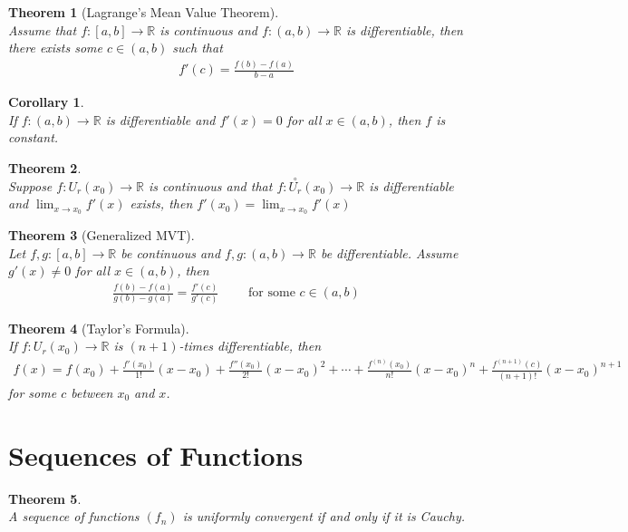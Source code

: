 \documentclass[10pt,a4paper]{article}
\newtheorem{theorem}{Theorem}
\newtheorem{corollary}{Corollary}
\theoremstyle{definition}
\theoremstyle{definition}
\numberwithin{equation}{section}
\numberwithin{theorem}{section}
\numberwithin{proposition}{section}
\numberwithin{lemma}{section}
\numberwithin{corollary}{section}
\begin{document}
\begin{theorem}[Lagrange's Mean Value Theorem]$ $
\\Assume that $f: [a, b] \to \mathbb{R}$ is continuous and $f: (a, b) \to \mathbb{R}$ is differentiable, then there exists some $c \in (a, b)$ such that 
\begin{align*}
f'(c) = \frac{f(b) - f(a)}{b - a}
\end{align*}
\end{theorem}

\begin{corollary}$ $
\\If $f:(a, b) \to \mathbb{R}$ is differentiable and $f'(x) = 0$ for all $x \in (a, b)$, then $f$ is constant. 
\end{corollary}

\begin{theorem}$ $
\\Suppose $f: U_r(x_0) \to \mathbb{R}$ is continuous and that $f: \overset{\circ}{U_r}(x_0) \to \mathbb{R}$ is differentiable and $\lim_{x \to x_0} f'(x)$ exists, then $f'(x_0) = \lim_{x \to x_0} f'(x)$
\end{theorem}

\begin{theorem}[Generalized MVT]$ $
\\Let $f, g: [a, b] \to \mathbb{R}$ be continuous and $f, g: (a, b) \to \mathbb{R}$ be differentiable. Assume $g'(x) \neq 0$ for all $x \in (a, b)$, then 
\begin{align*}
\frac{f(b) - f(a)}{g(b) - g(a)} = \frac{f'(c)}{g'(c)} \qquad \text{ for some } c \in (a, b)
\end{align*}
\end{theorem}

\begin{theorem}[Taylor's Formula]$ $
\\If $f: U_r(x_0) \to \mathbb{R}$ is $(n + 1)$-times differentiable, then 
\begin{align*}
f(x) = f(x_0) + \frac{f'(x_0)}{1!} (x - x_0) + \frac{f''(x_0)}{2!}(x - x_0)^2 + \cdots + \frac{f^{(n)}(x_0)}{n!}(x - x_0)^n + \frac{f^{(n+1)}(c)}{(n+1)!}(x - x_0)^{n+1}
\end{align*}
for some $c$ between $x_0$ and $x$. 
\end{theorem}


\newpage
\section{Sequences of Functions}
\begin{theorem}$ $
\\A sequence of functions $(f_n)$ is uniformly convergent if and only if it is Cauchy. 
\end{theorem}
\end{document}
